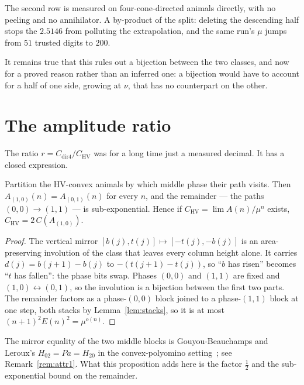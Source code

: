 \documentclass[11pt]{article}
\newcommand{\HV}{\mathrm{HV}}
\begin{document}
The second row is measured on four-cone-directed animals directly, with no
peeling and no annihilator. A by-product of the split: deleting the
descending half stops the $2.5146$ from polluting the extrapolation, and the
same run's $\mu$ jumps from $51$ trusted digits to $200$.

It remains true that this rules out a bijection between the two classes, and now
for a proved reason rather than an inferred one: a bijection would have to
account for a half of one side, growing at $\nu$, that has no counterpart on the
other.

\section{The amplitude ratio}
\label{sec:amplitude}

The ratio $r = C_{\text{dir4}}/C_{\HV}$ was for a long time just a measured
decimal. It has a closed expression.

\begin{proposition}
\label{prop:mirror}
Partition the HV-convex animals by which middle phase their path visits. Then
$A_{(1,0)}(n) = A_{(0,1)}(n)$ for every $n$, and the remainder --- the paths
$(0,0)\to(1,1)$ --- is sub-exponential. Hence if $C_{\HV} = \lim A(n)/\mu^n$
exists, $C_{\HV} = 2\,C(A_{(1,0)})$.
\end{proposition}

\begin{proof}
The vertical mirror $[b(j),t(j)] \mapsto [-t(j),-b(j)]$ is an area-preserving
involution of the class that leaves every column height alone. It carries
$d(j) = b(j{+}1)-b(j)$ to $-(t(j{+}1)-t(j))$, so ``$b$ has risen'' becomes
``$t$ has fallen'': the phase bits swap. Phases $(0,0)$ and $(1,1)$ are fixed
and $(1,0)\leftrightarrow(0,1)$, so the involution is a bijection between the
first two parts. The remainder factors as a phase-$(0,0)$ block joined to a
phase-$(1,1)$ block at one step, both stacks by Lemma~\ref{lem:stacks}, so it is
at most $(n{+}1)^2E(n)^2 = \mu^{o(n)}$.
\end{proof}

\begin{remark}[attribution --- 2 of 3]
\label{rem:attr2}
The mirror equality of the two middle blocks is Gouyou-Beauchamps and Leroux's
$H_{02} = Pa = H_{20}$ in the convex-polyomino setting~\cite{gblRoux2004}; see
Remark~\ref{rem:attr1}. What this proposition adds here is the factor
$\tfrac12$ and the sub-exponential bound on the remainder.
\end{remark}
\end{document}
